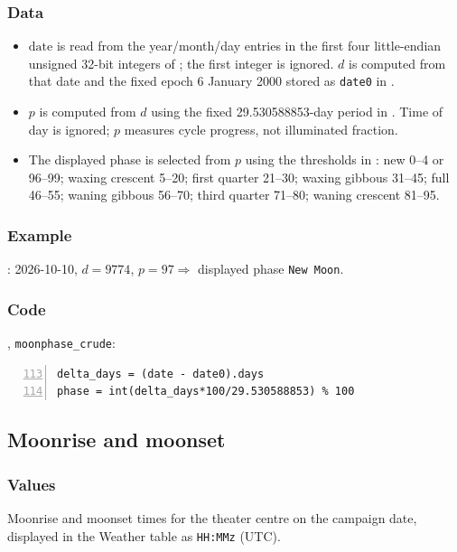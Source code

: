 \documentclass[10pt,a4paper]{amsart}
\begin{document}
\subsubsection*{Data}
\begin{itemize}
\setlength{\itemsep}{0pt}
\setlength{\parsep}{0pt}
\item $\text{date}$ is read from the year/month/day entries in the first
four little-endian unsigned 32-bit integers of ; the first
integer is ignored. $d$ is computed from that date and the fixed epoch
6 January 2000 stored as \texttt{date0} in .
\item $p$ is computed from $d$ using the fixed 29.530588853-day period in
. Time of day is ignored; $p$ measures
cycle progress, not illuminated fraction.
\item The displayed phase is selected from $p$ using the thresholds in
: new 0--4 or 96--99; waxing crescent
5--20; first quarter 21--30; waxing gibbous 31--45; full 46--55;
waning gibbous 56--70; third quarter 71--80; waning crescent 81--95.
\end{itemize}

\subsubsection*{Example}
: 2026-10-10,
$d=9774$, $p=97\Rightarrow$ displayed phase \texttt{New Moon}.
\subsubsection*{Code}
, \texttt{moonphase\_crude}:
\begin{lstlisting}[numbers=left,firstnumber=113,numberstyle=\tiny,xleftmargin=2em]
delta_days = (date - date0).days
phase = int(delta_days*100/29.530588853) % 100
\end{lstlisting}

\subsection{Moonrise and moonset}\label{subsec:moonrise-moonset}
\subsubsection*{Values}
Moonrise and moonset times for the theater centre on the
campaign date, displayed in the Weather table as \texttt{HH:MMz} (UTC).
\end{document}
